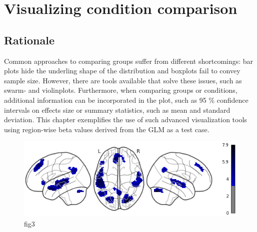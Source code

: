 \documentclass[12pt, letterpaper]{article}
\begin{document}
\section{Visualizing condition comparison}

\subsection{Rationale}
Common approaches to comparing groups suffer from different shortcomings: bar plots hide the underling shape of the distribution and boxplots fail to convey sample size. 
However, there are tools available that solve these issues, such as swarm- and violinplots. 
Furthermore, when comparing groups or conditions, additional information can be incorporated in the plot, such as 95 \% confidence intervals on effects size or summary statistics, such as mean and standard deviation.
This chapter exemplifies the use of such advanced visualization tools using region-wise beta values derived from the GLM as a test case.

\begin{figure}
  \includegraphics[width=\linewidth]{Figure3A.png}
  \caption{fig3}
  \label{fig:1}
\end{figure}


\end{document}
